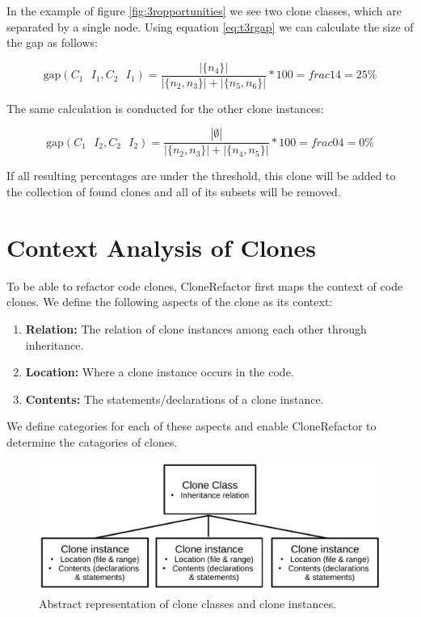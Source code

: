 In the example of figure \ref{fig:3ropportunities} we see two clone classes, which are separated by a single node. Using equation \ref{eq:t3rgap} we can calculate the size of the gap as follows:

\begin{equation}\label{eq:t3rexample}
\text{gap}(C_1\text{ }I_1, C_2\text{ }I_1) = \frac{|\{n_4\}|}{|\{n_2, n_3\}| + |\{n_5, n_6\}|} * 100 = frac{1}{4} = 25\%
\end{equation}

The same calculation is conducted for the other clone instances:

\begin{equation}\label{eq:t3rexample}
\text{gap}(C_1\text{ }I_2, C_2\text{ }I_2) = \frac{|\emptyset|}{|\{n_2, n_3\}| + |\{n_4, n_5\}|} * 100 = frac{0}{4} = 0\%
\end{equation}

If all resulting percentages are under the threshold, this clone will be added to the collection of found clones and all of its subsets will be removed.

\section{Context Analysis of Clones}\label{chap:contextsetup}
To be able to refactor code clones, CloneRefactor first maps the context of code clones. We define the following aspects of the clone as its context:
\begin{enumerate}
  \item \textbf{Relation:} The relation of clone instances among each other through inheritance.
  \item \textbf{Location:} Where a clone instance occurs in the code.
  \item \textbf{Contents:} The statements/declarations of a clone instance.
\end{enumerate}
We define categories for each of these aspects and enable CloneRefactor to determine the catagories of clones.

\begin{figure}[H]
  \centering
    \includegraphics[width=0.8\columnwidth]{img/context}
    \caption{Abstract representation of clone classes and clone instances.}
  \label{fig:clonecontext}
\end{figure}

